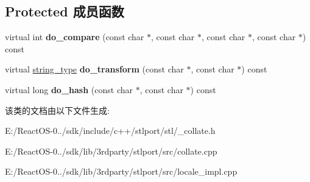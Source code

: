 \subsection*{Protected 成员函数}
\begin{DoxyCompactItemize}
\item 
\mbox{\label{classcollate_3_01char_01_4_ac0efedfb1a6b55c28a376d7f525fa1bd}} 
virtual int {\bfseries do\+\_\+compare} (const char $\ast$, const char $\ast$, const char $\ast$, const char $\ast$) const
\item 
\mbox{\label{classcollate_3_01char_01_4_acc5e7ef6003e75ba485267ac03f4e0b2}} 
virtual \hyperlink{structstring}{string\+\_\+type} {\bfseries do\+\_\+transform} (const char $\ast$, const char $\ast$) const
\item 
\mbox{\label{classcollate_3_01char_01_4_aaeccea90f9e719aeeae8a72516f52550}} 
virtual long {\bfseries do\+\_\+hash} (const char $\ast$, const char $\ast$) const
\end{DoxyCompactItemize}


该类的文档由以下文件生成\+:\begin{DoxyCompactItemize}
\item 
E\+:/\+React\+O\+S-\/0../sdk/include/c++/stlport/stl/\+\_\+collate.\+h\item 
E\+:/\+React\+O\+S-\/0../sdk/lib/3rdparty/stlport/src/collate.\+cpp\item 
E\+:/\+React\+O\+S-\/0../sdk/lib/3rdparty/stlport/src/locale\+\_\+impl.\+cpp\end{DoxyCompactItemize}

